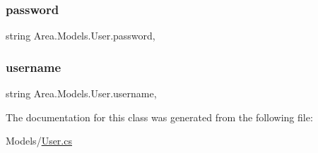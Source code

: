 \subsubsection{\texorpdfstring{password}{password}}
{\footnotesize\ttfamily string Area.\+Models.\+User.\+password\hspace{0.3cm}{\ttfamily [get]}, {\ttfamily [set]}}

\mbox{\label{classArea_1_1Models_1_1User_aa8dd2b8cd2c1550a96a53523fd4f5026}} 
\subsubsection{\texorpdfstring{username}{username}}
{\footnotesize\ttfamily string Area.\+Models.\+User.\+username\hspace{0.3cm}{\ttfamily [get]}, {\ttfamily [set]}}



The documentation for this class was generated from the following file\+:\begin{DoxyCompactItemize}
\item 
Models/\mbox{\hyperlink{User_8cs}{User.\+cs}}\end{DoxyCompactItemize}
